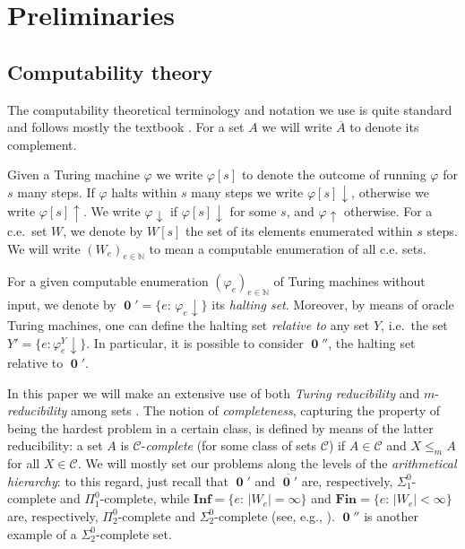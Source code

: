 \documentclass[10pt,A4]{amsart}
\theoremstyle{definition}
\theoremstyle{definition}
\newcommand{\N}{\mathbb{N}}
\newcommand{\HP}{\operatorname{\mathbf{0}} '}
\begin{document}
\section{Preliminaries}\label{sec:preliminaries}
\subsection*{Computability theory}
The computability theoretical terminology and notation we use is quite standard and follows mostly the textbook \cite{Soare-book}. For a set $A$ we will write $\overline{A}$ to denote its complement. 

Given a Turing machine $\varphi$ we write $\varphi[s]$ to denote the outcome of running $\varphi$ for $s$ many steps. If $\varphi$ halts within $s$ many steps we write $\varphi[s] \downarrow$, otherwise we write $\varphi[s] \uparrow$. We write $\varphi \downarrow$ if $\varphi[s] \downarrow$ for some $s$, and $\varphi \uparrow$ otherwise. For a c.e.~set $W$, we denote by $W[s]$ the set of its elements enumerated within $s$ steps. We will write $(W_e)_{e\in \N}$ to mean a computable enumeration of all c.e. sets. 

For a given computable enumeration $(\varphi_e)_{e \in \N}$ of Turing machines without input, we denote by $\HP = \{e \colon \, \varphi_e \downarrow\}$ its \emph{halting set}.  Moreover, by means of oracle Turing machines, one can define the halting set \emph{relative to} any set $Y$, i.e.~the set $Y'=\{e: \varphi_e^Y \downarrow\}$. In particular, it is possible to consider $\HP '$, the halting set relative to $\HP$.
%

%
In this paper we will make an extensive use of both \emph{Turing reducibility} and $m$-\emph{reducibility} among sets \cite{Soare-book}. The notion of \emph{completeness}, capturing the property of being the hardest problem in a certain class, is defined by means of the latter reducibility: a set $A$ is $\mathcal{C}$-\emph{complete} (for some class of sets $\mathcal{C}$) if $A \in \mathcal{C}$ and $X \le_m A$ for all $X \in \mathcal{C}$. We will mostly set our problems along the levels of the \emph{arithmetical hierarchy}: to this regard, just recall that $\HP$ and $\overline{\HP}$ are, respectively, $\Sigma_1^0$-complete and $\Pi_1^0$-complete, while $\textbf{Inf} = \{e \colon \, |W_e|= \infty \}$ and $\textbf{Fin} = \{e \colon \, |W_e| < \infty \}$ are, respectively, $\Pi_2^0$-complete and $\Sigma_2^0$-complete (see, e.g., \cite[Theorem 4.3.2]{Soare-book}). $\HP'$ is another example of a 
 $\Sigma_2^0$-complete set.
\end{document}

